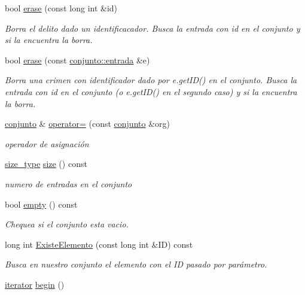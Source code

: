 \begin{DoxyCompactItemize}
bool \hyperlink{classconjunto_a92332298c1202e92027b48f01c69ae91}{erase} (const long int \&id)
\begin{DoxyCompactList}\small\item\em Borra el delito dado un identificacador. Busca la entrada con id en el conjunto y si la encuentra la borra. \end{DoxyCompactList}\item 
bool \hyperlink{classconjunto_a3dd3632366e2280e886888652e4b11e7}{erase} (const \hyperlink{classconjunto_a7630ace7cb17bcec07daf5804f1a0780}{conjunto\+::entrada} \&e)
\begin{DoxyCompactList}\small\item\em Borra una crimen con identificador dado por e.\+get\+I\+D() en el conjunto. Busca la entrada con id en el conjunto (o e.\+get\+I\+D() en el segundo caso) y si la encuentra la borra. \end{DoxyCompactList}\item 
\hyperlink{classconjunto}{conjunto} \& \hyperlink{classconjunto_a0faea1cd2fd592a6fe5a4b87385726b5}{operator=} (const \hyperlink{classconjunto}{conjunto} \&org)
\begin{DoxyCompactList}\small\item\em operador de asignación \end{DoxyCompactList}\item 
\hyperlink{classconjunto_a0cc9902da62790ec2a6d59f4559c2df5}{size\+\_\+type} \hyperlink{classconjunto_af9962de5f6425f2030dc0e63015f85b3}{size} () const 
\begin{DoxyCompactList}\small\item\em numero de entradas en el conjunto \end{DoxyCompactList}\item 
bool \hyperlink{classconjunto_a904716d6ae739f0461880b08138cf4e4}{empty} () const 
\begin{DoxyCompactList}\small\item\em Chequea si el conjunto esta vacio. \end{DoxyCompactList}\item 
long int \hyperlink{classconjunto_a3bc2835aa2016f8e70f8a86350b64319}{Existe\+Elemento} (const long int \&I\+D) const 
\begin{DoxyCompactList}\small\item\em Busca en nuestro conjunto el elemento con el I\+D pasado por parámetro. \end{DoxyCompactList}\item 
\hypertarget{classconjunto_a9747d18cc29695c016b79cbf65d5ea7f}{}\hyperlink{classconjunto_1_1iterator}{iterator} \hyperlink{classconjunto_a9747d18cc29695c016b79cbf65d5ea7f}{begin} ()\label{classconjunto_a9747d18cc29695c016b79cbf65d5ea7f}


\end{DoxyCompactItemize}
